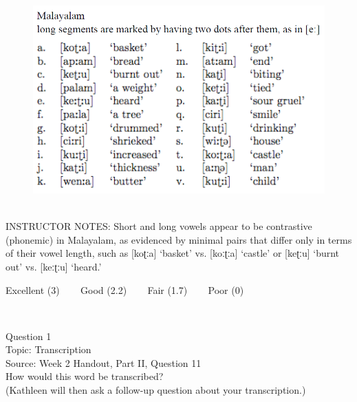 \documentclass[12pt]{article}
\begin{document}
\begin{figure}[H]
\includegraphics{../images/malayalam.png}
\end{figure}

~\\
INSTRUCTOR NOTES: Short and long vowels appear to be contrastive (phonemic) in Malayalam, as evidenced by minimal pairs that differ only in terms of their vowel length, such as [koʈːa] ‘basket’ vs. [koːʈːa] ‘castle’ or [keʈːu] ‘burnt out’ vs. [keːʈːu] ‘heard.’


\vfill
Excellent (3) ~~~ Good (2.2) ~~~ Fair (1.7) ~~~ Poor (0)
\newpage

\begin{center}
\textbf{{\color{red}{\HUGE END OF EXAM}}}\\

\end{center}
\newpage

\begin{center}
\textbf{{\color{blue}{\HUGE START OF EXAM\\}}}

\textbf{{\color{blue}{\HUGE Student ID: 68058\\}}}

\textbf{{\color{blue}{\HUGE \\}}}

\end{center}
\newpage

{\large Question 1}\\

Topic: Transcription\\
Source: Week 2 Handout, Part II, Question 11\\

How would this word be transcribed?\\ (Kathleen will then ask a follow-up question about your transcription.)\\
\end{document}

